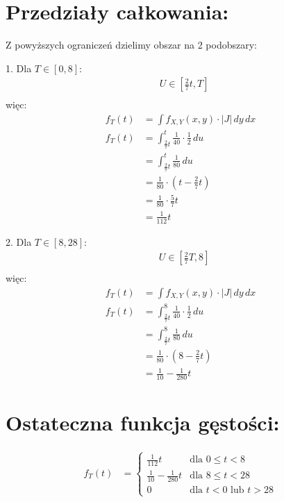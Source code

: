 \documentclass[12pt]{article}
\begin{document}
\section*{Przedziały całkowania:}
Z powyższych ograniczeń dzielimy obszar na 2 podobszary: \\
\begin{list}{}{}

  \item 1. Dla $T \in [0, 8]$: \\
  \begin{align*}
    &U \in [\frac{2}{7}t, T]\\
  \end{align*}
  więc:
  \begin{align*}
    f_T(t) &= \int f_{X,Y}(x, y) \cdot |J| \, dy \, dx \\
    f_T(t) &= \int_{\frac{2}{7}t}^t \frac{1}{40} \cdot \frac{1}{2} \, du \\
    &= \int_{\frac{2}{7}t}^t \frac{1}{80} \, du \\
    &= \frac{1}{80} \cdot (t - \frac{2}{7}t) \\
    &= \frac{1}{80} \cdot \frac{5}{7}t \\
    &= \frac{1}{112}t
  \end{align*}
\pagebreak
  \item 2. Dla $T \in [8, 28]$: \\
  \begin{align*}
    &U \in [\frac{2}{7}T, 8]\\
  \end{align*}
  więc:
  \begin{align*}
    f_T(t) &= \int f_{X,Y}(x, y) \cdot |J| \, dy \, dx \\
    f_T(t) &= \int_{\frac{2}{7}t}^8 \frac{1}{40} \cdot \frac{1}{2} \, du \\
    &= \int_{\frac{2}{7}t}^8 \frac{1}{80} \, du \\
    &= \frac{1}{80} \cdot (8 - \frac{2}{7}t) \\
    &= \frac{1}{10} - \frac{1}{280}t
  \end{align*}
\end{list}

\section*{Ostateczna funkcja gęstości:}
\begin{align*}
    f_T(t) &= \begin{cases}
        \frac{1}{112}t & \text{dla } 0 \leq t < 8 \\
        \frac{1}{10} - \frac{1}{280}t & \text{dla } 8 \leq t < 28 \\
        0 & \text{dla } t < 0 \text{ lub } t > 28
    \end{cases}
\end{align*}
  
\end{document}
